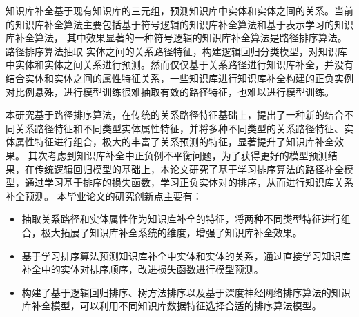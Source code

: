 


\makeatother


\makeatother



\begin{cabstract}
  知识库补全基于现有知识库的三元组，预测知识库中实体和实体之间的关系。当前的知识库补全算法主要包括基于符号逻辑的知识库补全算法和基于表示学习的知识库补全算法，
  其中效果显著的一种符号逻辑的知识库补全算法是路径排序算法。路径排序算法抽取
  实体之间的关系路径特征，构建逻辑回归分类模型，对知识库中实体和实体之间关系进行预测。然而仅仅基于关系路径进行知识库补全，并没有结合实体和实体之间的属性特征关系，一些知识库进行知识库补全构建的正负实例对比例悬殊，进行模型训练很难抽取有效的路径特征，也难以进行模型训练。

  本研究基于路径排序算法，在传统的关系路径特征基础上，提出了一种新的结合不同关系路径特征和不同类型实体属性特征，并将多种不同类型的关系路径特征、实体属性特征进行组合，极大的丰富了关系预测的特征，显著提升了知识库补全效果。
  其次考虑到知识库补全中正负例不平衡问题，为了获得更好的模型预测结果，在传统逻辑回归模型的基础上，本论文研究了基于学习排序算法的路径补全模型，通过学习基于排序的损失函数，学习正负实体对的排序，从而进行知识库关系补全预测。
  本毕业论文的研究创新点主要有：
  \begin{itemize}[$\bullet$]
    \item 抽取关系路径和实体属性作为知识库补全的特征，将两种不同类型特征进行组合，极大拓展了知识库补全系统的维度，增强了知识库补全效果。
    \item 基于学习排序算法预测知识库补全中实体和实体的关系，通过直接学习知识库补全中的实体对排序顺序，改进损失函数进行模型预测。
    \item
        构建了基于逻辑回归排序、树方法排序以及基于深度神经网络排序算法的知识库补全模型，可以利用不同知识库数据特征选择合适的排序算法模型。
  \end{itemize}
\end{cabstract}

